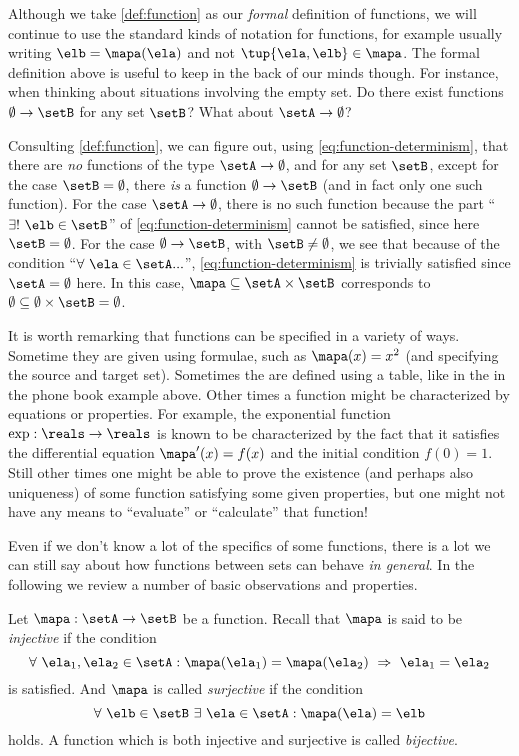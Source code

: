 Although we take \cref{def:function} as our \emph{formal} definition of functions, we will continue to use the standard kinds of notation for functions, for example usually writing $\elb = \mapa(\ela)$ and not $\tup{\ela, \elb} \in \mapa$. The formal definition above is useful to keep in the back of our minds though. For instance, when thinking about situations involving the empty set. Do there exist functions $\emptyset \to \setB$ for any set $\setB$? What about $\setA \to \emptyset$? 

Consulting \cref{def:function}, we can figure out, using \cref{eq:function-determinism}, that there are \emph{no} functions of the type $\setA \to \emptyset$, and for any set $\setB$, except for the case $\setB = \emptyset$, there \emph{is} a function $\emptyset \to \setB$ (and in fact only one such function). For the case $\setA \to \emptyset$, there is no such function because the part ``$\exists ! \ \elb \in \setB$'' of \cref{eq:function-determinism} cannot be satisfied, since here $\setB = \emptyset$. For the case $\emptyset \to \setB$, with $\setB \neq \emptyset$, we see that because of the condition ``$\forall \ \ela \in \setA ...$'', \cref{eq:function-determinism} is trivially satisfied since $\setA = \emptyset$ here. In this case, $\mapa \subseteq \setA \times \setB$ corresponds to $\emptyset \subseteq \emptyset \times \setB = \emptyset$. 

It is worth remarking that functions can be specified in a variety of ways. Sometime they are given using formulae, such as $\mapa(x)=x^2$ (and specifying the source and target set). Sometimes the are defined using a table, like in the in the phone book example above. Other times a function might be characterized by equations or properties. For example, the exponential function $\exp : \reals \to \reals$ is known to be  characterized by the fact that it satisfies the differential equation $\mapa'(x) = f(x)$ and the initial condition $f(0) =1$. Still other times one might be able to prove the existence (and perhaps also uniqueness) of some function satisfying some given properties, but one might not have any means to ``evaluate'' or ``calculate'' that function! 

Even if we don't know a lot of the specifics of some functions, there is a lot we can still say about how functions between sets can behave \emph{in general}. In the following we review a number of basic observations and properties. 

Let $\mapa: \setA \to \setB$ be a function. Recall that $\mapa$ is said to be \emph{injective} if the condition
\begin{equation}\label{eq:injectivity-cond}
\forall \ \ela_1, \ela_2 \in \setA : \mapa(\ela_1) = \mapa(\ela_2) \ \Rightarrow \  \ela_1 = \ela_2
\end{equation}
is satisfied. And $\mapa$ is called \emph{surjective} if the condition
\begin{equation}\label{eq:surjectivity-cond}
\forall \ \elb \in \setB \ \exists \ \ela \in \setA : \mapa(\ela) = \elb
\end{equation}
holds. A function which is both injective and surjective is called \emph{bijective}. 

